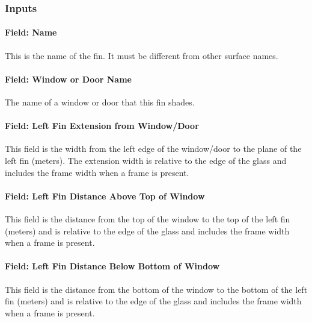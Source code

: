 \subsubsection{Inputs}\label{inputs-28-002}

\paragraph{Field: Name}\label{field-name-26-003}

This is the name of the fin. It must be different from other surface names.

\paragraph{Field: Window or Door Name}\label{field-window-or-door-name-2}

The name of a window or door that this fin shades.

\paragraph{Field: Left Fin Extension from Window/Door}\label{field-left-fin-extension-from-windowdoor}

This field is the width from the left edge of the window/door to the plane of the left fin (meters). The extension width is relative to the edge of the glass and includes the frame width when a frame is present.

\paragraph{Field: Left Fin Distance Above Top of Window}\label{field-left-fin-distance-above-top-of-window}

This field is the distance from the top of the window to the top of the left fin (meters) and is relative to the edge of the glass and includes the frame width when a frame is present.

\paragraph{Field: Left Fin Distance Below Bottom of Window}\label{field-left-fin-distance-below-bottom-of-window}

This field is the distance from the bottom of the window to the bottom of the left fin (meters) and is relative to the edge of the glass and includes the frame width when a frame is present.

